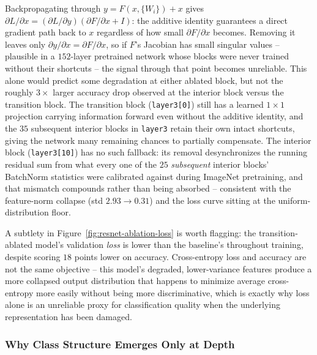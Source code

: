Backpropagating through $y=F(x,\{W_i\})+x$ gives
$\partial L/\partial x = (\partial L/\partial y)(\partial F/\partial x + I)$:
the additive identity guarantees a direct gradient path back to $x$
regardless of how small $\partial F/\partial x$ becomes. Removing it leaves
only $\partial y/\partial x = \partial F/\partial x$, so if $F$'s Jacobian
has small singular values -- plausible in a $152$-layer pretrained network
whose blocks were never trained without their shortcuts -- the signal
through that point becomes unreliable. This alone would predict some
degradation at either ablated block, but not the roughly $3\times$
larger accuracy drop observed at the interior block versus the transition
block. The transition block (\texttt{layer3[0]}) still has a learned
$1{\times}1$ projection carrying information forward even without the
additive identity, and the $35$ subsequent interior blocks in
\texttt{layer3} retain their own intact shortcuts, giving the network many
remaining chances to partially compensate. The interior block
(\texttt{layer3[10]}) has no such fallback: its removal desynchronizes the
running residual sum from what every one of the $25$ \emph{subsequent}
interior blocks' BatchNorm statistics were calibrated against during
ImageNet pretraining, and that mismatch compounds rather than being
absorbed -- consistent with the feature-norm collapse (std $2.93\to0.31$)
and the loss curve sitting at the uniform-distribution floor.

A subtlety in Figure~\ref{fig:resnet-ablation-loss} is worth flagging: the
transition-ablated model's validation \emph{loss} is lower than the
baseline's throughout training, despite scoring $18$ points lower on
accuracy. Cross-entropy loss and accuracy are not the same objective --
this model's degraded, lower-variance features produce a more collapsed
output distribution that happens to minimize average cross-entropy more
easily without being more discriminative, which is exactly why loss alone
is an unreliable proxy for classification quality when the underlying
representation has been damaged.

\subsubsection{Why Class Structure Emerges Only at Depth}

